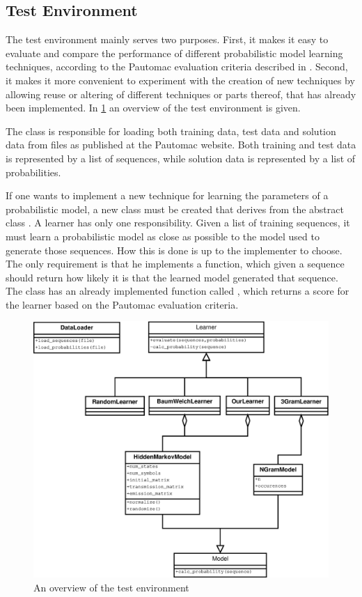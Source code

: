 \subsection{Test Environment}

The test environment mainly serves two purposes. First, it makes it easy to evaluate and compare the performance of different probabilistic model learning techniques, according to the Pautomac evaluation criteria described in .
Second, it makes it more convenient to experiment with the creation of new techniques by allowing reuse or altering of different techniques or parts thereof, that has already been implemented. In \ref{fig:testenvironment} an overview of the test environment is given.

The  class is responsible for loading both training data, test data and solution data from files as published at the Pautomac website. Both training and test data is represented by a list of sequences, while solution data is represented by a list of probabilities.

If one wants to implement a new technique for learning the parameters of a probabilistic model, a new class must be created that derives from the abstract class . A learner has only one responsibility. Given a list of training sequences, it must learn a probabilistic model as close as possible to the model used to generate those sequences. How this is done is up to the implementer to choose. The only requirement is that he implements a  function, which given a sequence should return how likely it is that the learned model generated that sequence.
The  class has an already implemented function called , which returns a score for the learner based on the Pautomac evaluation criteria.

\begin{figure}[!htb]
\centering
\includegraphics[scale=.4]{pictures/test-environment-overview.eps}
\caption{An overview of the test environment}
\label{fig:testenvironment}
\end{figure}

